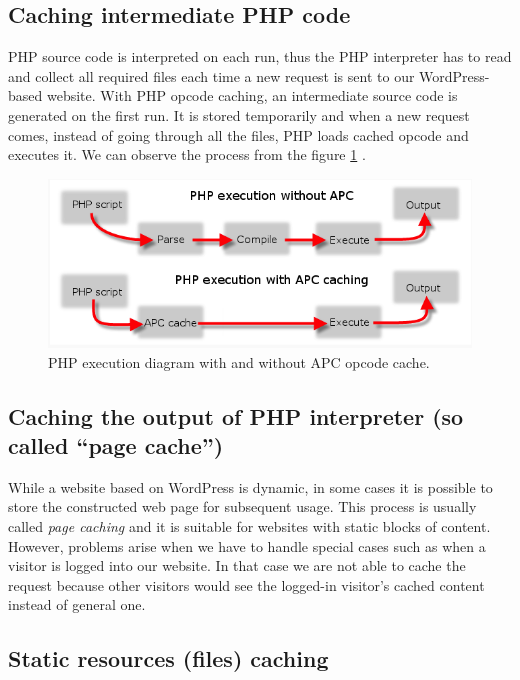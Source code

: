 \subsection*{Caching intermediate PHP code}

PHP source code is interpreted on each run, thus the PHP interpreter has to read and collect all required files each time a new request is sent to our WordPress-based website. With PHP opcode caching, an intermediate source code is generated on the first run. It is stored temporarily and when a new request comes, instead of going through all the files, PHP loads cached opcode and executes it. We can observe the process from the figure \ref{fig:php-opcode-caching} \cite{Fig:PHP-opcode-caching}.

\begin{figure}[H]
\begin{center}
\includegraphics[scale=0.5]{figures/php-opcode-caching.png}
\caption{PHP execution diagram with and without APC opcode cache.}
\label{fig:php-opcode-caching}
\end{center}
\end{figure}

\subsection*{Caching the output of PHP interpreter (so called “page cache”)}

While a website based on WordPress is dynamic, in some cases it is possible to store the constructed web page for subsequent usage. This process is usually called \emph{page caching} and it is suitable for websites with static blocks of content. However, problems arise when we have to handle special cases such as when a visitor is logged into our website. In that case we are not able to cache the request because other visitors would see the logged-in visitor’s cached content instead of general one.

\subsection*{Static resources (files) caching}

